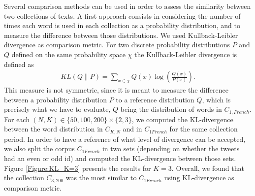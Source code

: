 Several comparison methods can be used in order to assess the similarity between two collections of texts. A first approach consists in considering the number of times each word is used in each collection as a probability distribution, and to measure the difference between those distributions. We used Kullback-Leibler divergence \citep{kullback_information_1997} as comparison metric. For two discrete probability distributions $P$ and $Q$ defined on the same probability space $\chi$ the Kullback-Leibler divergence is defined as
\begin{align}
\label{eq:KL}
KL(Q\|P) =  \sum_{x\in \chi}Q(x)\log{(\frac{Q(x)}{P(x)})}.
\end{align}
This measure is not symmetric, since it is meant to measure the difference between a probability distribution $P$ to a reference distribution $Q$, which is precisely what we have to evaluate, $Q$ being the distribution of words in $C_{1, French}$. For each $(N,K) \in  \{50, 100, 200\} \times \{2,3\}$, we computed the KL-divergence between the word distribution in $C_{K,N}$ and in $C_{1 French}$ for the same collection period. In order to have a reference of what level of divergence can be accepted, we also split the corpus $C_{1 French}$ in two sets (depending on whether the tweets had an even or odd id) and computed the KL-divergence between those sets. Figure \ref{Figure:KL_K=3} presents the results for $K=3$. Overall, we found that the collection $C_{3,200}$ was the most similar to $C_{1 French}$ using KL-divergence as comparison metric.


